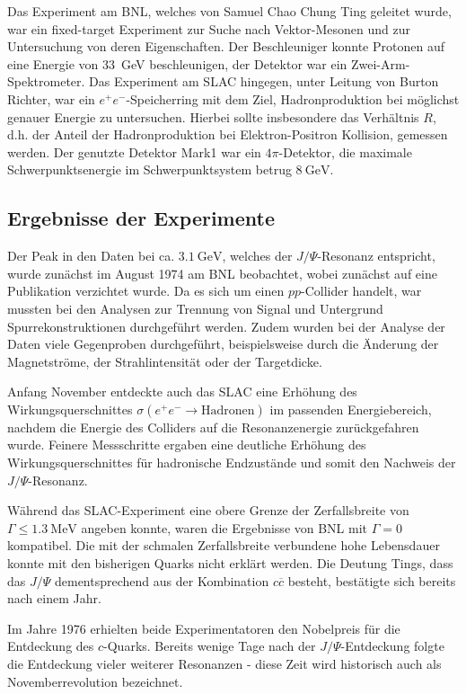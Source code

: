 Das Experiment am BNL, welches von Samuel Chao Chung Ting geleitet wurde, war ein fixed-target Experiment zur Suche nach Vektor-Mesonen und zur Untersuchung von deren Eigenschaften.
Der Beschleuniger konnte Protonen auf eine Energie von \SI{33}{\giga\electronvolt} beschleunigen, der Detektor war ein Zwei-Arm-Spektrometer.
Das Experiment am SLAC hingegen, unter Leitung von Burton Richter, war ein $e^+ e^-$-Speicherring mit dem Ziel, Hadronproduktion bei möglichst genauer Energie zu untersuchen.
Hierbei sollte insbesondere das Verhältnis $R$, d.h. der Anteil der Hadronproduktion bei Elektron-Positron Kollision, gemessen werden.
Der genutzte Detektor Mark1 war ein $4\pi$-Detektor, die maximale Schwerpunktsenergie im Schwerpunktsystem betrug $\SI{8}{\giga\electronvolt}$. 

\subsection{Ergebnisse der Experimente}

Der Peak in den Daten bei ca. $\SI{3.1}{\giga\electronvolt}$, welches der $J/\Psi$-Resonanz entspricht, wurde zunächst im August 1974 am BNL beobachtet, wobei zunächst auf eine Publikation verzichtet wurde.
Da es sich um einen $pp$-Collider handelt, war mussten bei den Analysen zur Trennung von Signal und Untergrund Spurrekonstruktionen durchgeführt werden.
Zudem wurden bei der Analyse der Daten viele Gegenproben durchgeführt, beispielsweise durch die Änderung der Magnetströme, der Strahlintensität oder der Targetdicke.

Anfang November entdeckte auch das SLAC eine Erhöhung des Wirkungsquerschnittes $\sigma\left(e^+ e^- \to \text{Hadronen}\right)$ im passenden Energiebereich, nachdem die Energie des Colliders auf die Resonanzenergie zurückgefahren wurde.
Feinere Messschritte ergaben eine deutliche Erhöhung des Wirkungsquerschnittes für hadronische Endzustände und somit den Nachweis der $J/\Psi$-Resonanz.

Während das SLAC-Experiment eine obere Grenze der Zerfallsbreite von $\Gamma \leq \SI{1.3}{\mega\electronvolt}$ angeben konnte, waren die Ergebnisse von BNL mit $\Gamma = 0$ kompatibel.
Die mit der schmalen Zerfallsbreite verbundene hohe Lebensdauer konnte mit den bisherigen Quarks nicht erklärt werden.
Die Deutung Tings, dass das $J/\Psi$ dementsprechend aus der Kombination $c\overline{c}$ besteht, bestätigte sich bereits nach einem Jahr.

Im Jahre 1976 erhielten beide Experimentatoren den Nobelpreis für die Entdeckung des $c$-Quarks.
Bereits wenige Tage nach der $J/\Psi$-Entdeckung folgte die Entdeckung vieler weiterer Resonanzen - diese Zeit wird historisch auch als Novemberrevolution bezeichnet.

